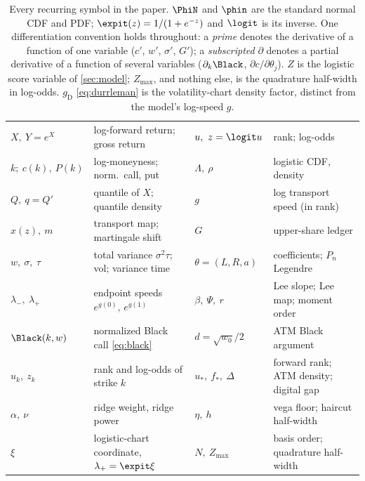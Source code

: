 \begin{table}[htbp]
\centering\small
\setlength{\tabcolsep}{4pt}
\begin{tabular}{@{}llll@{}}
\toprule
$X,\ Y=e^{X}$ & log-forward return; gross return &
$u,\ z=\logit u$ & rank; log-odds \\[2pt]
$k;\ c(k),\ P(k)$ & log-moneyness; norm.\ call, put &
$\Lambda,\ \rho$ & logistic CDF, density \\[2pt]
$Q,\ q=Q'$ & quantile of $X$; quantile density &
$g$ & log transport speed (in rank) \\[2pt]
$x(z),\ m$ & transport map; martingale shift &
$G$ & upper-share ledger \\[2pt]
$w,\ \sigma,\ \tau$ & total variance $\sigma^{2}\tau$; vol; variance time &
$\theta=(L,R,a)$ & coefficients; $P_n$ Legendre \\[2pt]
$\lambda_-,\ \lambda_+$ & endpoint speeds $e^{g(0)},\,e^{g(1)}$ &
$\beta,\ \Psi,\ r$ & Lee slope; Lee map; moment order \\[2pt]
$\Black(k,w)$ & normalized Black call \eqref{eq:black} &
$d=\sqrt{w_0}/2$ & ATM Black argument \\[2pt]
$u_k,\ z_k$ & rank and log-odds of strike $k$ &
$u_*,\ f_*,\ \Delta$ & forward rank; ATM density; digital gap \\[2pt]
$\alpha,\ \nu$ & ridge weight, ridge power &
$\eta,\ h$ & vega floor; haircut half-width \\[2pt]
$\xi$ & logistic-chart coordinate, $\lambda_+=\expit\xi$ &
$N,\ Z_{\max}$ & basis order; quadrature half-width \\
\bottomrule
\end{tabular}
\caption{Every recurring symbol in the paper.  $\PhiN$ and $\phin$ are the
standard normal CDF and PDF; $\expit(z)=1/(1+e^{-z})$ and $\logit$ is its
inverse.  One differentiation convention holds throughout: a \emph{prime}
denotes the derivative of a function of one variable ($c'$, $w'$,
$\sigma'$, $G'$); a \emph{subscripted} $\partial$ denotes a partial
derivative of a function of several variables ($\partial_k\Black$,
$\partial c/\partial\theta_j$).  $Z$ is the logistic score variable of
\cref{sec:model}; $Z_{\max}$, and nothing else, is the quadrature
half-width in log-odds.  $g_{\mathrm{D}}$ \eqref{eq:durrleman} is the
volatility-chart density factor, distinct from the model's log-speed
$g$.}
\label{tab:ledger}
\end{table}
